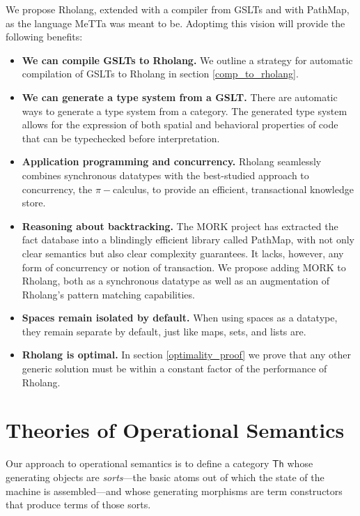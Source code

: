 \documentclass{article}
\begin{document}
We propose Rholang, extended with a compiler from GSLTs and with PathMap, as the language MeTTa was meant to be.  Adoptimg this vision will provide the following benefits:

\begin{itemize}
    \item {\bf We can compile GSLTs to Rholang.} We outline a strategy for automatic compilation of GSLTs to Rholang in section \ref{comp_to_rholang}.
    \item {\bf We can generate a type system from a GSLT.} There are automatic ways to generate a type system from a category.
The generated type system allows for the expression of both spatial and behavioral properties of code that can be typechecked before interpretation.
    \item {\bf Application programming and concurrency.} Rholang seamlessly combines synchronous datatypes with the best-studied approach to concurrency, the $\pi-$calculus, to provide an efficient, transactional knowledge store.
    \item {\bf Reasoning about backtracking.} The MORK project has extracted the fact database into a blindingly efficient library called PathMap, with not only clear semantics but also clear complexity guarantees.  It lacks, however, any form of concurrency or notion of transaction.  We propose adding MORK to Rholang, both as a synchronous datatype as well as an augmentation of Rholang's pattern matching capabilities.
    \item {\bf Spaces remain isolated by default.} When using spaces as a datatype, they remain separate by default, just like maps, sets, and lists are.
    \item {\bf Rholang is optimal.}  In section \ref{optimality_proof} we prove that any other generic solution must be within a constant factor of the performance of Rholang.
\end{itemize}

\section{Theories of Operational Semantics}

Our approach to operational semantics is to define a category $\mathsf{Th}$ whose generating objects are \emph{sorts}---the basic atoms out of which the state of the machine is assembled---and whose generating morphisms are term constructors that produce terms of those sorts.
\end{document}
